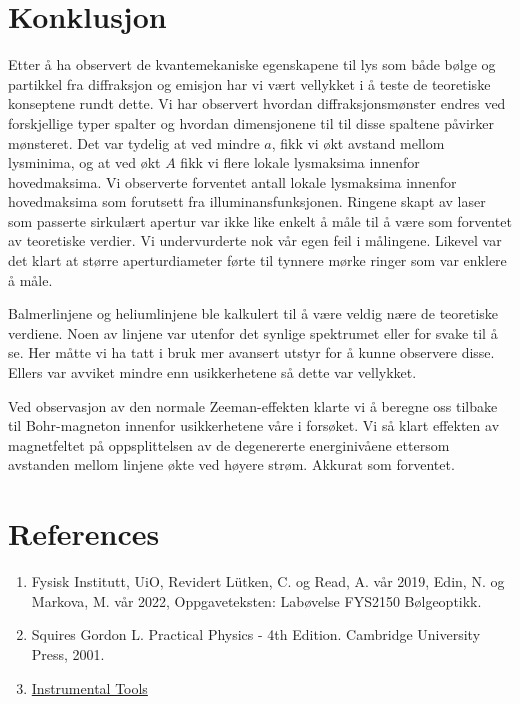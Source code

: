 \documentclass[reprint,norsk,notitlepage,floatfix]{revtex4-2}
\begin{document}
\section{Konklusjon} \label{sec: konklusjon}
Etter å ha observert de kvantemekaniske egenskapene til lys som både bølge og partikkel fra diffraksjon og emisjon har vi vært vellykket i å teste de teoretiske konseptene rundt dette. Vi har observert hvordan diffraksjonsmønster endres ved forskjellige typer spalter og hvordan dimensjonene til til disse spaltene påvirker mønsteret. Det var tydelig at ved mindre $a$, fikk vi økt avstand mellom lysminima, og at ved økt $A$ fikk vi flere lokale lysmaksima innenfor hovedmaksima. Vi observerte forventet antall lokale lysmaksima innenfor hovedmaksima som forutsett fra illuminansfunksjonen. Ringene skapt av laser som passerte sirkulært apertur var ikke like enkelt å måle til å være som forventet av teoretiske verdier. Vi undervurderte nok vår egen feil i målingene. Likevel var det klart at større aperturdiameter førte til tynnere mørke ringer som var enklere å måle. 

Balmerlinjene og heliumlinjene ble kalkulert til å være veldig nære de teoretiske verdiene. Noen av linjene var utenfor det synlige spektrumet eller for svake til å se. Her måtte vi ha tatt i bruk mer avansert utstyr for å kunne observere disse. Ellers var avviket mindre enn usikkerhetene så dette var vellykket. 


Ved observasjon av den normale Zeeman-effekten klarte vi å beregne oss tilbake til Bohr-magneton innenfor usikkerhetene våre i forsøket. Vi så klart effekten av magnetfeltet på oppsplittelsen av de degenererte energinivåene ettersom avstanden mellom linjene økte ved høyere strøm. Akkurat som forventet. 


\section*{References} \label{sec: references}
\begin{enumerate}[label=\Roman*.]
  \item\label{source: lab} Fysisk Institutt, UiO, Revidert Lütken, C. og Read, A. vår 2019, Edin, N. og Markova, M. vår 2022, Oppgaveteksten: Labøvelse FYS2150 Bølgeoptikk.
  \item\label{source: squire} Squires Gordon L. Practical Physics - 4th Edition. Cambridge University Press, 2001.
  \item\label{source: diffraction} \href{https://cdn.instrumentationtools.com/wp-content/uploads/2018/02/diffraction-grating.png}{Instrumental Tools}
  \end{enumerate}
\end{document}
